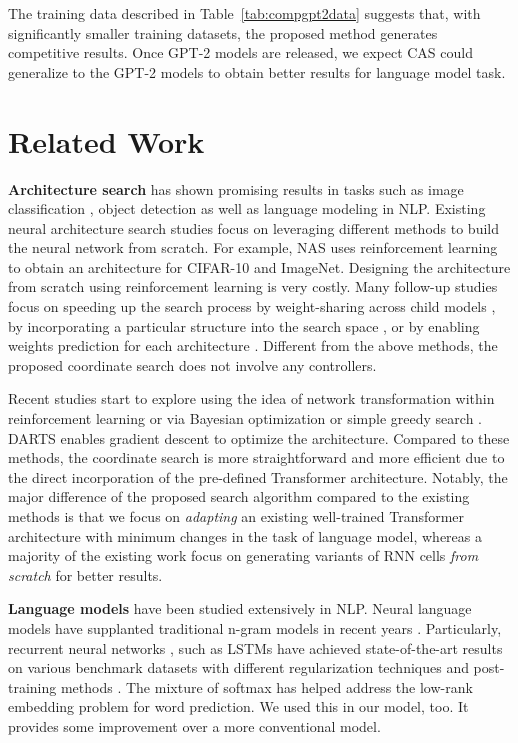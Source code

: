 \documentclass[11pt,a4paper]{article}
\begin{document}
The training data described in Table~\ref{tab:compgpt2data} suggests that, with significantly smaller training datasets, the proposed method generates competitive results. Once GPT-2 models are released, we expect CAS could generalize to the GPT-2 models to obtain better results for language model task. \section{Related Work}

{\bf Architecture search} has shown promising results in tasks such as image classification \cite{ZophL16,liu2017progressive,liu2017hierarchical,real2018regularized,ZophVSL18,Liu09055}, object detection \cite{ZophVSL18} as well as language modeling \cite{ZophL16,PhamGZLD18,Liu09055} in NLP. Existing neural architecture search studies focus on leveraging different methods to build the neural network from scratch. For example, NAS \cite{ZophL16} uses reinforcement learning to obtain an architecture for CIFAR-10 and ImageNet. 
Designing the architecture from scratch using  reinforcement learning is very costly. Many follow-up studies focus on speeding up the search process by weight-sharing across child models \cite{PhamGZLD18,cai2018efficient}, by incorporating a particular structure into the search space \cite{liu2017progressive,liu2017hierarchical}, or by enabling weights prediction for each architecture \cite{brock2017smash,baker2017accelerating}. 
Different from the above methods, the proposed coordinate search does not involve any controllers. 

Recent studies start to explore using the idea of network transformation within reinforcement learning \cite{cai2018efficient} or via Bayesian optimization \cite{jin2018efficient} or simple greedy search \cite{Elsken04528}. DARTS \cite{Liu09055} enables gradient descent to optimize the architecture. 
Compared to these methods, the coordinate search is more straightforward and more efficient due to the direct incorporation of the pre-defined Transformer architecture. Notably, the major difference of the proposed search algorithm compared to the existing methods is that we focus on \emph{adapting} an existing well-trained Transformer architecture with minimum changes in the task of language model, whereas a majority of the existing work focus on generating variants of RNN cells \emph{from scratch} for better results.

{\bf Language models} have been studied extensively in NLP. Neural language models have supplanted traditional n-gram models in recent years 
\cite{bengio2003neural,mnih2007three,mikolov2010recurrent}. Particularly, recurrent neural networks \cite{inan2016tying,Merity02182,melis2017state,KrauseK0R18}, such as LSTMs have achieved state-of-the-art results on various benchmark datasets with different regularization techniques and post-training methods \cite{GraveJU16,KrauseK0R18}. 
The mixture of softmax \cite{Yang03953} has helped address the low-rank embedding problem for word prediction. We used this in our model, too. It provides some improvement over a more conventional model. 
\end{document}
